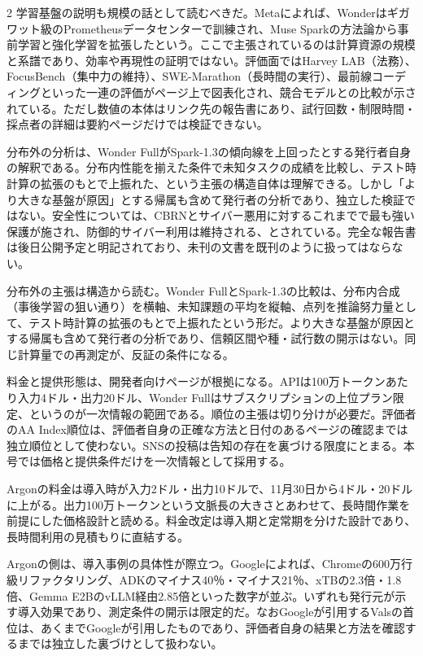 \documentclass[lualatex,a4paper,10pt]{jlreq}
\begin{document}
\begin{multicols}{2}
学習基盤の説明も規模の話として読むべきだ。Metaによれば、Wonderはギガワット級のPrometheusデータセンターで訓練され、Muse Sparkの方法論から事前学習と強化学習を拡張したという。ここで主張されているのは計算資源の規模と系譜であり、効率や再現性の証明ではない。評価面ではHarvey LAB（法務）、FocusBench（集中力の維持）、SWE-Marathon（長時間の実行）、最前線コーディングといった一連の評価がページ上で図表化され、競合モデルとの比較が示されている。ただし数値の本体はリンク先の報告書にあり、試行回数・制限時間・採点者の詳細は要約ページだけでは検証できない。
\cite{B01,B62,B63,B02,B64,B03}


分布外の分析は、Wonder FullがSpark-1.3の傾向線を上回ったとする発行者自身の解釈である。分布内性能を揃えた条件で未知タスクの成績を比較し、テスト時計算の拡張のもとで上振れた、という主張の構造自体は理解できる。しかし「より大きな基盤が原因」とする帰属も含めて発行者の分析であり、独立した検証ではない。安全性については、CBRNとサイバー悪用に対するこれまでで最も強い保護が施され、防御的サイバー利用は維持される、とされている。完全な報告書は後日公開予定と明記されており、未刊の文書を既刊のように扱ってはならない。
\cite{B01,B62,B63,B02,B64,B03}


分布外の主張は構造から読む。Wonder FullとSpark-1.3の比較は、分布内合成（事後学習の狙い通り）を横軸、未知課題の平均を縦軸、点列を推論努力量として、テスト時計算の拡張のもとで上振れたという形だ。より大きな基盤が原因とする帰属も含めて発行者の分析であり、信頼区間や種・試行数の開示はない。同じ計算量での再測定が、反証の条件になる。
\cite{B01,B62,B63,B02,B64,B03}


料金と提供形態は、開発者向けページが根拠になる。APIは100万トークンあたり入力4ドル・出力20ドル、Wonder Fullはサブスクリプションの上位プラン限定、というのが一次情報の範囲である。順位の主張は切り分けが必要だ。評価者のAA Index順位は、評価者自身の正確な方法と日付のあるページの確認までは独立順位として使わない。SNSの投稿は告知の存在を裏づける限度にとまる。本号では価格と提供条件だけを一次情報として採用する。
\cite{B01,B62,B63,B02,B64,B03}


Argonの料金は導入時が入力2ドル・出力10ドルで、11月30日から4ドル・20ドルに上がる。出力100万トークンという文脈長の大きさとあわせて、長時間作業を前提にした価格設計と読める。料金改定は導入期と定常期を分けた設計であり、長時間利用の見積もりに直結する。
\cite{B05,B65,B08,B04,B07,B06}


Argonの側は、導入事例の具体性が際立つ。Googleによれば、Chromeの600万行級リファクタリング、ADKのマイナス40％・マイナス21％、xTBの2.3倍・1.8倍、Gemma E2BのvLLM経由2.85倍といった数字が並ぶ。いずれも発行元が示す導入効果であり、測定条件の開示は限定的だ。なおGoogleが引用するValsの首位は、あくまでGoogleが引用したものであり、評価者自身の結果と方法を確認するまでは独立した裏づけとして扱わない。
\cite{B05,B65,B08,B04,B07,B06}



\end{multicols}
\end{document}
